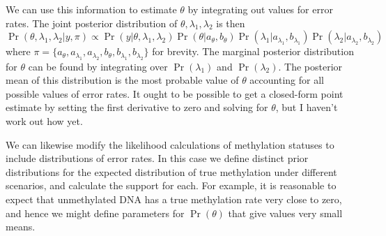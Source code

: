 \documentclass[12pt,longbibliography]{article}
\begin{document}
We can use this information to estimate $\theta$ by integrating out values for error rates.
The joint posterior distribution of $\theta, \lambda_1, \lambda_2$ is then
\begin{equation}
    \Pr(\theta, \lambda_1, \lambda_2 | y, \pi)
    \propto 
    \Pr(y | \theta, \lambda_1, \lambda_2)
    \Pr(\theta | a_{\theta}, b_{\theta})
    \Pr(\lambda_1 | a_{\lambda_1}, b_{\lambda_1})
    \Pr(\lambda_2 | a_{\lambda_2}, b_{\lambda_2})
\end{equation}
where $\pi=\{a_{\theta}, a_{\lambda_1}, a_{\lambda_2}, b_{\theta}, b_{\lambda_1}, b_{\lambda_2}\}$ for brevity.
The marginal posterior distribution for $\theta$ can be found by integrating over $\Pr(\lambda_1)$ and $\Pr(\lambda_2)$.
The posterior mean of this distribution is the most probable value of $\theta$ accounting for all possible values of error rates. It ought to be possible to get a closed-form point estimate by setting the first derivative to zero and solving for $\theta$, but I haven't work out how yet.

We can likewise modify the likelihood calculations of methylation statuses to include distributions of error rates.
In this case we define distinct prior distributions for the expected distribution of true methylation under different scenarios, and calculate the support for each.
For example, it is reasonable to expect that unmethylated DNA has a true methylation rate very close to zero, and hence we might define parameters for $\Pr(\theta)$ that give values very small means.
\end{document}
